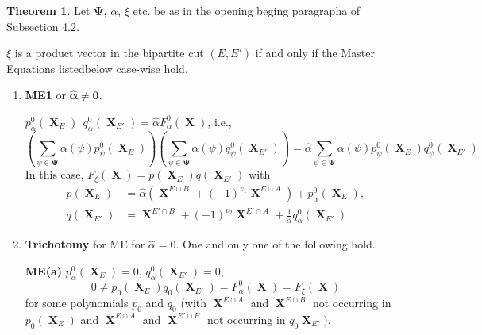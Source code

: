 \documentclass[a4paper,12pt]{article}
\DeclareMathOperator{\x}{\mathrm{X}}
\theoremstyle{definition}
\theoremstyle{underlinethm}
\newtheorem{thm}{Theorem}[section]
\theoremstyle{definition}
\begin{document}
\begin{thm}\label{thm-4.3}
Let $\boldsymbol{\Psi}$, $\alpha$, $\xi$ etc. be as in the opening beging paragrapha of Subsection 4.2.

$\xi$ is a product vector in the bipartite cut $(E, E')$ if and only if the Master Equations listedbelow case-wise hold.
\begin{enumerate}[label = (\roman*)]
\item \textbf{ME1} or ${\boldsymbol{\hat{\alpha} \neq 0}}$.

$p_{\alpha}^{0}(\boldsymbol{\x}_{E}) ~~q_{\alpha}^{0} (\boldsymbol{\x}_{E'}) = \hat{\alpha} F_{\alpha}^{0} (\boldsymbol{\x})$, i.e.,
\begin{equation}
\left(\sum_{\psi \in \boldsymbol{\Psi}} \alpha(\psi)p_{\psi}^{0} (\boldsymbol{\x}_{E})\right) \left(\sum_{\psi \in \boldsymbol{\Psi}}\alpha(\psi)  q_{\psi}^{0} (\boldsymbol{\x}_{E'})\right) = \hat{\alpha} \sum_{\psi \in \boldsymbol{\Psi}} \alpha(\psi) p_{\psi}^{0} (\boldsymbol{\x}_{E}) q_{\psi}^{0}(\boldsymbol{\x}_{E'})\tag{4.44}\label{eq-4.44}
\end{equation}
In this case, $F_{\xi}(\boldsymbol{\x}) = p(\boldsymbol{\x}_{E}) q(\boldsymbol{\x}_{E'})$ with
\begin{align*}
p(\boldsymbol{\x}_{E}) &= \hat{\alpha} \left(\boldsymbol{\x}^{E \cap B} + (-1)^{v_{1}} \boldsymbol{\x}^{E \cap A} \right) + p_{\alpha}^{0}(\boldsymbol{\x}_{E}),\\
q(\boldsymbol{\x}_{E'}) &= \boldsymbol{\x}^{E' \cap B} + (-1)^{v_{2}} \boldsymbol{\x}^{E' \cap A} + \frac{1}{\hat{\alpha}} q_{\alpha}^{0} (\boldsymbol{\x}_{E'})\tag{4.45}\label{eq-4.45}
\end{align*}

\item \textbf{Trichotomy} for ME for $\hat{\alpha} = 0$. One and only one of the following hold.

\textbf{ME(a)} $p_{\alpha}^{0} (\boldsymbol{\x}_{E}) = 0$, $q_{\alpha}^{0} (\boldsymbol{\x}_{E'}) = 0$,
\begin{equation}
0 \neq p_{0} (\boldsymbol{\x}_{E}) q_{0}(\boldsymbol{\x}_{E'}) = F_{\alpha}^{0} (\boldsymbol{\x}) = F_{\xi}(\boldsymbol{\x})\tag{4.46}\label{eq-4.46}
\end{equation}
for some polynomials $p_{0}$ and $q_{0}$ (with $\boldsymbol{\x}^{E \cap A}$ and $\boldsymbol{\x}^{E \cap B}$ not occurring in $p_{0}(\boldsymbol{\x}_{E})$ and $\boldsymbol{\x}^{E \cap A}$ and $\boldsymbol{\x}^{E' \cap B}$ not occurring in $q_{0} \boldsymbol{\x}_{E'})$.


\end{enumerate}
\end{thm}
\end{document}
